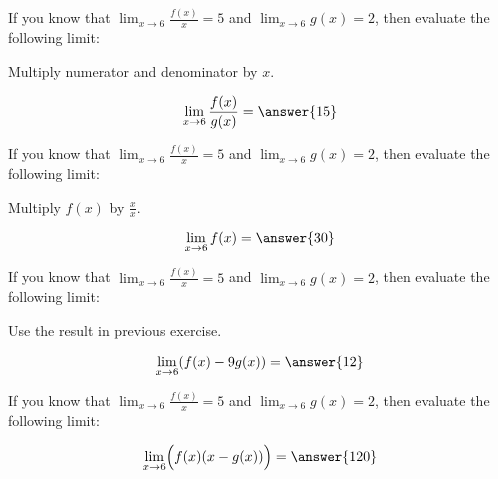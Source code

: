 \documentclass{ximera}
\author{Steven Gubkin\Nelalakos}
\begin{document}
\begin{exercise}

	If you know that $\lim_{x \to 6} \frac{f(x)}{x} = 5$ and $\lim_{x \to 6} g(x) = 2$, then evaluate the following limit:
	
	\begin{hint}
		Multiply numerator and denominator by $x$.
	\end{hint}
	
	\[
		\lim_{x \to 6} \frac{f(x)}{g(x)} = \answer{15}
	\]
	
\end{exercise}

\begin{exercise}

	If you know that $\lim_{x \to 6} \frac{f(x)}{x} = 5$ and $\lim_{x \to 6} g(x) = 2$, then evaluate the following limit:
	
	\begin{hint}
		Multiply $f(x)$ by $\frac{x}{x}$.
	\end{hint}
	
	\[
		\lim_{x \to 6} f(x) = \answer{30}
	\]
	\end{exercise}
	\begin{exercise}

	If you know that $\lim_{x \to 6} \frac{f(x)}{x} = 5$ and $\lim_{x \to 6} g(x) = 2$, then evaluate the following limit:
	
	\begin{hint}
		Use the result in previous exercise.
	\end{hint}
	
	\[
		\lim_{x \to 6} (f(x)-9g(x)) = \answer{12}
	\]

\end{exercise}
\begin{exercise}

	If you know that $\lim_{x \to 6} \frac{f(x)}{x} = 5$ and $\lim_{x \to 6} g(x) = 2$, then evaluate the following limit:
	
	\[
		\lim_{x \to 6} \Bigl(f(x)(x-g(x))\Bigr) = \answer{120}
	\]

\end{exercise}
\end{document}
